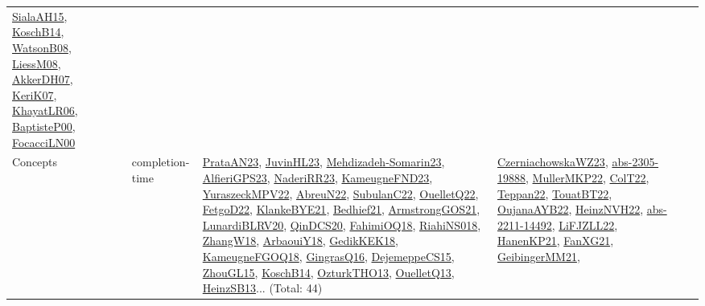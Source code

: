 {\begin{longtable}{lp{3cm}>{\raggedright}p{6cm}>{\raggedright}p{6cm}p{8cm}}
\href{papers/SialaAH15.pdf}{SialaAH15}\cite{SialaAH15}, \href{papers/KoschB14.pdf}{KoschB14}\cite{KoschB14}, \href{papers/WatsonB08.pdf}{WatsonB08}\cite{WatsonB08}, \href{articles/LiessM08.pdf}{LiessM08}\cite{LiessM08}, \href{papers/AkkerDH07.pdf}{AkkerDH07}\cite{AkkerDH07}, \href{papers/KeriK07.pdf}{KeriK07}\cite{KeriK07}, \href{articles/KhayatLR06.pdf}{KhayatLR06}\cite{KhayatLR06}, \href{articles/BaptisteP00.pdf}{BaptisteP00}\cite{BaptisteP00}, \href{papers/FocacciLN00.pdf}{FocacciLN00}\cite{FocacciLN00}\\
Concepts & completion-time & \href{articles/PrataAN23.pdf}{PrataAN23}\cite{PrataAN23}, \href{papers/JuvinHL23.pdf}{JuvinHL23}\cite{JuvinHL23}, \href{papers/Mehdizadeh-Somarin23.pdf}{Mehdizadeh-Somarin23}\cite{Mehdizadeh-Somarin23}, \href{articles/AlfieriGPS23.pdf}{AlfieriGPS23}\cite{AlfieriGPS23}, \href{articles/NaderiRR23.pdf}{NaderiRR23}\cite{NaderiRR23}, \href{papers/KameugneFND23.pdf}{KameugneFND23}\cite{KameugneFND23}, \href{articles/YuraszeckMPV22.pdf}{YuraszeckMPV22}\cite{YuraszeckMPV22}, \href{articles/AbreuN22.pdf}{AbreuN22}\cite{AbreuN22}, \href{articles/SubulanC22.pdf}{SubulanC22}\cite{SubulanC22}, \href{papers/OuelletQ22.pdf}{OuelletQ22}\cite{OuelletQ22}, \href{articles/FetgoD22.pdf}{FetgoD22}\cite{FetgoD22}, \href{papers/KlankeBYE21.pdf}{KlankeBYE21}\cite{KlankeBYE21}, \href{articles/Bedhief21.pdf}{Bedhief21}\cite{Bedhief21}, \href{papers/ArmstrongGOS21.pdf}{ArmstrongGOS21}\cite{ArmstrongGOS21}, \href{articles/LunardiBLRV20.pdf}{LunardiBLRV20}\cite{LunardiBLRV20}, \href{articles/QinDCS20.pdf}{QinDCS20}\cite{QinDCS20}, \href{articles/FahimiOQ18.pdf}{FahimiOQ18}\cite{FahimiOQ18}, \href{papers/RiahiNS018.pdf}{RiahiNS018}\cite{RiahiNS018}, \href{articles/ZhangW18.pdf}{ZhangW18}\cite{ZhangW18}, \href{papers/ArbaouiY18.pdf}{ArbaouiY18}\cite{ArbaouiY18}, \href{articles/GedikKEK18.pdf}{GedikKEK18}\cite{GedikKEK18}, \href{papers/KameugneFGOQ18.pdf}{KameugneFGOQ18}\cite{KameugneFGOQ18}, \href{papers/GingrasQ16.pdf}{GingrasQ16}\cite{GingrasQ16}, \href{papers/DejemeppeCS15.pdf}{DejemeppeCS15}\cite{DejemeppeCS15}, \href{papers/ZhouGL15.pdf}{ZhouGL15}\cite{ZhouGL15}, \href{papers/KoschB14.pdf}{KoschB14}\cite{KoschB14}, \href{articles/OzturkTHO13.pdf}{OzturkTHO13}\cite{OzturkTHO13}, \href{papers/OuelletQ13.pdf}{OuelletQ13}\cite{OuelletQ13}, \href{articles/HeinzSB13.pdf}{HeinzSB13}\cite{HeinzSB13}... (Total: 44) & \href{articles/CzerniachowskaWZ23.pdf}{CzerniachowskaWZ23}\cite{CzerniachowskaWZ23}, \href{articles/abs-2305-19888.pdf}{abs-2305-19888}\cite{abs-2305-19888}, \href{articles/MullerMKP22.pdf}{MullerMKP22}\cite{MullerMKP22}, \href{articles/ColT22.pdf}{ColT22}\cite{ColT22}, \href{papers/Teppan22.pdf}{Teppan22}\cite{Teppan22}, \href{papers/TouatBT22.pdf}{TouatBT22}\cite{TouatBT22}, \href{papers/OujanaAYB22.pdf}{OujanaAYB22}\cite{OujanaAYB22}, \href{articles/HeinzNVH22.pdf}{HeinzNVH22}\cite{HeinzNVH22}, \href{articles/abs-2211-14492.pdf}{abs-2211-14492}\cite{abs-2211-14492}, \href{papers/LiFJZLL22.pdf}{LiFJZLL22}\cite{LiFJZLL22}, \href{papers/HanenKP21.pdf}{HanenKP21}\cite{HanenKP21}, \href{articles/FanXG21.pdf}{FanXG21}\cite{FanXG21}, \href{papers/GeibingerMM21.pdf}{GeibingerMM21}\cite{GeibingerMM21}, 
\end{longtable}}
